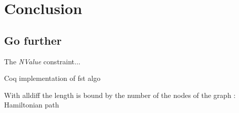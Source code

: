 \section{Conclusion}

\subsection{Go further}
The \textit{NValue} constraint...

Coq implementation of fst algo

With alldiff the length is bound by the number of the nodes of the graph : Hamiltonian path